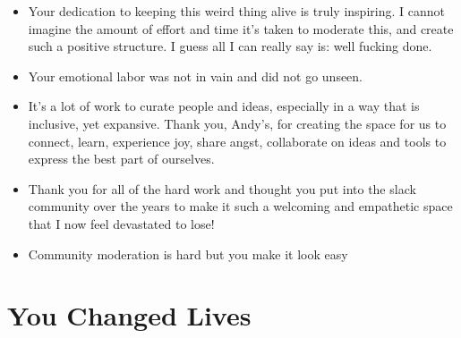 \documentclass[
]{book}
\providecommand{\tightlist}{%
  \setlength{\itemsep}{0pt}\setlength{\parskip}{0pt}}
\begin{document}
\begin{itemize}
\tightlist
\item
  Your dedication to keeping this weird thing alive is truly inspiring. I cannot imagine the amount of effort and time it's taken to moderate this, and create such a positive structure. I guess all I can really say is: well fucking done.
\item
  Your emotional labor was not in vain and did not go unseen.
\item
  It's a lot of work to curate people and ideas, especially in a way that is inclusive, yet expansive. Thank you, Andy's, for creating the space for us to connect, learn, experience joy, share angst, collaborate on ideas and tools to express the best part of ourselves.
\item
  Thank you for all of the hard work and thought you put into the slack community over the years to make it such a welcoming and empathetic space that I now feel devastated to lose!
\item
  Community moderation is hard but you make it look easy
\end{itemize}

\section{You Changed Lives}\label{you-changed-lives}
\end{document}
